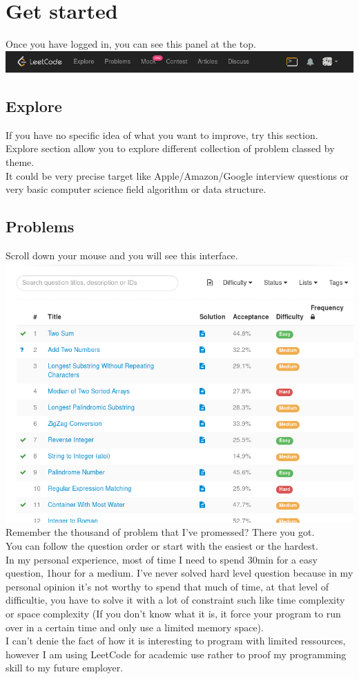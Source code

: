 \documentclass[12pt, letterpaper]{article}
\begin{document}
\section{Get started}
Once you have logged in, you can see this panel at the top.\\
\includegraphics[width=\linewidth]{img/L3.png}
\subsection{Explore}
If you have no specific idea of what you want to improve, try this section.\\
Explore section allow you to explore different collection of problem classed by theme.\\
It could be very precise target like Apple/Amazon/Google interview questions or very basic computer science field algorithm or data structure. \\

\subsection{Problems}
Scroll down your mouse and you will see this interface.\\
\includegraphics[width=\linewidth]{img/L5.png}
Remember the thousand of problem that I've promessed? There you got.\\
You can follow the question order or start with the easiest or the hardest.\\
In my personal experience, most of time I need to spend 30min for a easy question,
1hour for a medium. I've never solved hard level question because in my personal opinion it's not worthy to spend that much of time, at that level of difficultie, you have to solve it with a lot of constraint such like time complexity or space complexity (If you don't know what it is, it force your program to run over in a certain time and only use a limited memory space).\\
I can't denie the fact of how it is interesting to program with limited ressources, however I am using LeetCode for academic use rather to proof my programming skill to my future employer.
\end{document}
